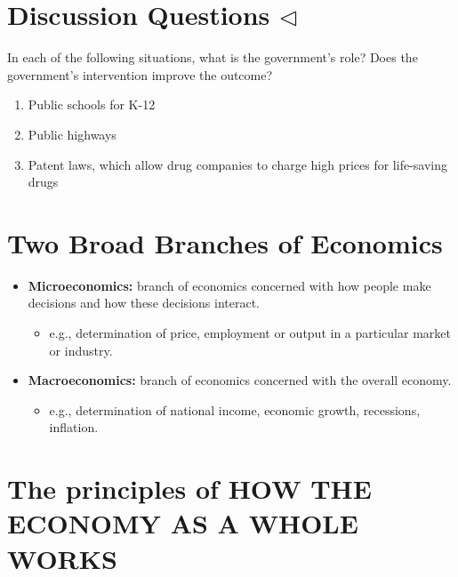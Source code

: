 \documentclass[
]{book}
\providecommand{\tightlist}{%
  \setlength{\itemsep}{0pt}\setlength{\parskip}{0pt}}
\begin{document}
\hypertarget{discussion-questions-triangleleft}{%
\section{\texorpdfstring{Discussion Questions \(\triangleleft\)}{Discussion Questions \textbackslash triangleleft}}\label{discussion-questions-triangleleft}}

In each of the following situations, what is the government's role? Does the government's intervention improve the outcome?

\begin{enumerate}
\def\labelenumi{\alph{enumi}.}
\item
  Public schools for K-12
\item
  Public highways
\item
  Patent laws, which allow drug companies to charge high prices for life-saving drugs
\end{enumerate}

\hypertarget{two-broad-branches-of-economics}{%
\section{Two Broad Branches of Economics}\label{two-broad-branches-of-economics}}

\begin{itemize}
\tightlist
\item
  \textbf{Microeconomics:} branch of economics concerned with how people make decisions and how these decisions interact.

  \begin{itemize}
  \tightlist
  \item
    e.g., determination of price, employment or output in a particular market or industry.
  \end{itemize}
\item
  \textbf{Macroeconomics:} branch of economics concerned with the overall economy.

  \begin{itemize}
  \tightlist
  \item
    e.g., determination of national income, economic growth, recessions, inflation.
  \end{itemize}
\end{itemize}

\hypertarget{the-principles-of-how-the-economy-as-a-whole-works}{%
\section{The principles of HOW THE ECONOMY AS A WHOLE WORKS}\label{the-principles-of-how-the-economy-as-a-whole-works}}
\end{document}
